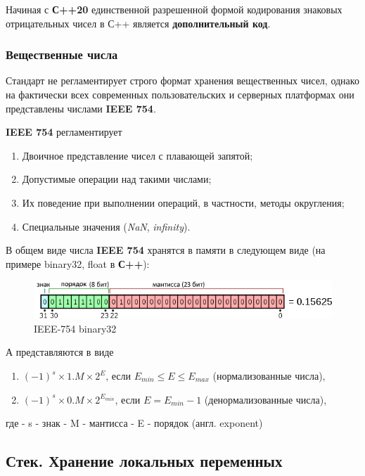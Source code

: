 Начиная с \textbf{С++20} единственной разрешенной формой кодирования
знаковых отрицательных чисел в С++ является \textbf{дополнительный код}.

\subsubsection{Вещественные числа}

Стандарт не регламентирует строго формат хранения вещественных чисел,
однако на фактически всех современных пользовательских и серверных
платформах они представлены числами \textbf{IEEE 754}.

\textbf{IEEE 754} регламентирует
\begin{enumerate}
  \item Двоичное представление чисел с плавающей запятой;
  \item Допустимые операции над такими числами;
  \item Их поведение при выполнении операций, в частности, методы округления;
  \item Специальные значения (\emph{NaN}, \emph{infinity}).
\end{enumerate}

В общем виде числа \textbf{IEEE 754} хранятся в памяти в следующем виде
(на примере binary32, float в \textbf{С++}):

\begin{figure}
\centering
\includegraphics{./res/ieee-binary32.png}
\caption{IEEE-754 binary32}
\end{figure}

А представляются в виде 
\begin{enumerate}
   \item \((-1)^s \times 1.M \times 2^E\), если \(E_{min} \le E \le E_{max}\) (нормализованные числа),
   \item \((-1)^s \times 0.M \times 2^{E_{min}}\), если \(E=E_{min}-1\) (денормализованные числа),
\end{enumerate}
где - s - знак - M - мантисса - E - порядок (англ. exponent)

\subsection{Стек. Хранение локальных переменных}


